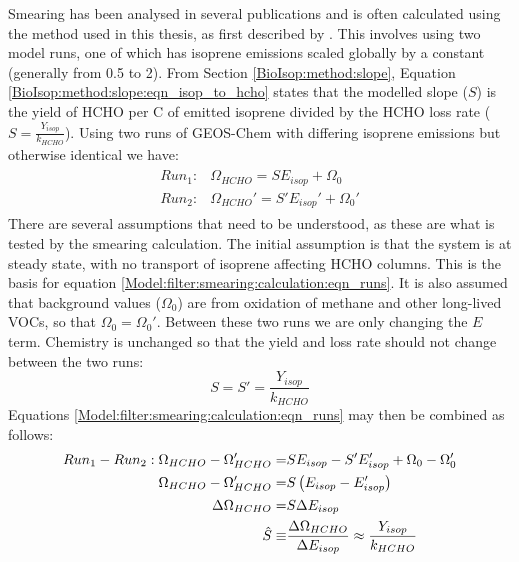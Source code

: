       Smearing has been analysed in several publications \parencite[e.g.,][]{Martin2003nox, Palmer2003, Millet2006, Stavrakou2009, Marais2012, Barkley2013, Zhu2014, Wolfe2016, Surl2018} and is often calculated using the method used in this thesis, as first described by \textcite{Palmer2003}.
      This involves using two model runs, one of which has isoprene emissions scaled globally by a constant (generally from 0.5 to 2).
      From Section \ref{BioIsop:method:slope}, Equation \ref{BioIsop:method:slope:eqn_isop_to_hcho} states that the modelled slope ($S$) is the yield of HCHO per C of emitted isoprene divided by the HCHO loss rate ($S = \frac{Y_{isop}}{k_{HCHO}}$).
      Using two runs of GEOS-Chem with differing isoprene emissions but otherwise identical we have:
      \begin{eqnarray}
      \label{Model:filter:smearing:calculation:eqn_runs}
      \begin{split}
      Run_1 :&  \Omega_{HCHO} = S E_{isop} + \Omega_0 \\
      Run_2 :&  \Omega_{HCHO}' = S' E_{isop}' + \Omega_0' 
      \end{split}
      \end{eqnarray}
      There are several assumptions that need to be understood, as these are what is tested by the smearing calculation.
      The initial assumption is that the system is at steady state, with no transport of isoprene affecting HCHO columns.
      This is the basis for equation \ref{Model:filter:smearing:calculation:eqn_runs}.
      It is also assumed that background values ($\Omega_0$) are from oxidation of methane and other long-lived VOCs, so that $\Omega_0 = \Omega_0'$.
      Between these two runs we are only changing the $E$ term.
      Chemistry is unchanged so that the yield and loss rate should not change between the two runs: 
      \begin{equation}
      S = S' = \frac{Y_{isop}}{k_{HCHO}}
      \end{equation}
      Equations \ref{Model:filter:smearing:calculation:eqn_runs} may then be combined as follows:
      \begin{eqnarray}
      Run_1-Run_2 : \Omega_{HCHO} - \Omega_{HCHO}' = & S E_{isop} - S' E_{isop}' +\Omega_0 - \Omega_0' \notag \\
      \Omega_{HCHO} - \Omega_{HCHO}' = & S \left( E_{isop} - E_{isop}' \right) \notag \\
      \Delta \Omega_{HCHO} = & S \Delta E_{isop}  \notag \\
      \hat{S} \equiv & \frac{\Delta{\Omega_{HCHO}}}{\Delta E_{isop}} \approx \frac{Y_{isop}}{k_{HCHO}} \label{Model:filter:smearing:calculation:eqn_hats}
      \end{eqnarray}
